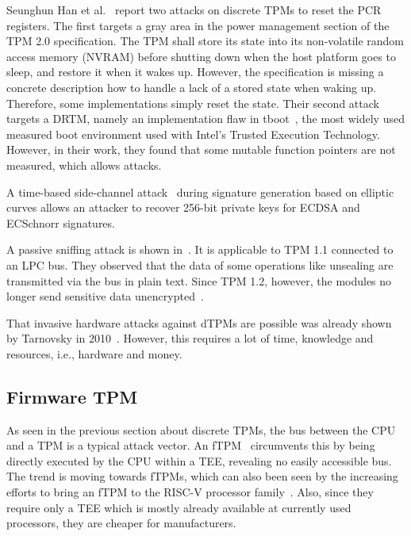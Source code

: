 Seunghun Han et al.~\cite{aBadDream} report two attacks on discrete TPMs to reset the PCR registers. The first targets a gray area in the power management section of the TPM 2.0 specification. The TPM shall store its state into its non-volatile random access memory (NVRAM) before shutting down when the host platform goes to sleep, and restore it when it wakes up. However, the specification is missing a concrete description how to handle a lack of a stored state when waking up. Therefore, some implementations simply reset the state. Their second attack targets a DRTM, namely an implementation flaw in tboot~\cite{tboot}, the most widely used measured boot environment used with Intel's Trusted Execution Technology. However, in their work, they found that some mutable function pointers are not measured, which allows attacks.

A time-based side-channel attack~\cite{Moghimi2019} during signature generation based on elliptic curves allows an attacker to recover 256-bit private keys for ECDSA and ECSchnorr signatures.

A passive sniffing attack is shown in~\cite{Kursawe2005AnalyzingTP}. It is applicable to TPM 1.1 connected to an LPC bus. They observed that the data of some operations like unsealing are transmitted via the bus in plain text. Since TPM 1.2, however, the modules no longer send sensitive data unencrypted~\cite{Winter2013}.

That invasive hardware attacks against dTPMs are possible was already shown by Tarnovsky in 2010~\cite{tarnovsky}. However, this requires a lot of time, knowledge and resources, i.e., hardware and money.


\subsection{Firmware TPM}



As seen in the previous section about discrete TPMs, the bus between the CPU and a TPM is a typical attack vector. An fTPM~\cite{Raj2015, 197213} circumvents this by being directly executed by the CPU within a \ac{TEE}, revealing no easily accessible bus.
The trend is moving towards fTPMs, which can also been seen by the increasing efforts to bring an fTPM to the RISC-V processor family~\cite{Boubakri2021}. Also, since they require only a TEE which is mostly already available at currently used processors, they are cheaper for manufacturers.

